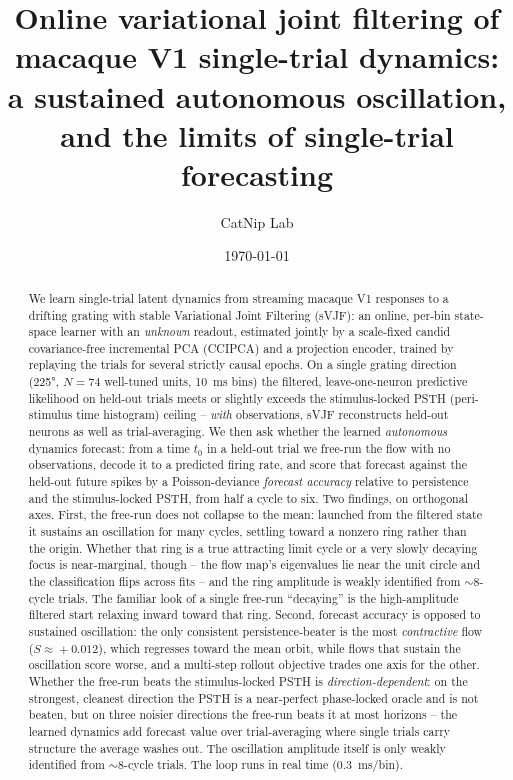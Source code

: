 \documentclass{article}
\title{Online variational joint filtering of macaque V1 single-trial dynamics:\\
a sustained autonomous oscillation, and the limits of single-trial forecasting}
\author{CatNip Lab}
\date{\today}
\newcommand{\svjf}{sVJF}
\begin{document}
\maketitle

\begin{abstract}
We learn single-trial latent dynamics from streaming macaque V1 responses to a drifting
grating with stable Variational Joint Filtering (\svjf{}): an online, per-bin state-space
learner with an \emph{unknown} readout, estimated jointly by a scale-fixed candid
covariance-free incremental PCA (CCIPCA) and a projection encoder, trained by replaying the
trials for several strictly causal epochs. On a single grating direction (\ang{225},
$N{=}74$ well-tuned units, \SI{10}{ms} bins) the filtered, leave-one-neuron predictive
likelihood on held-out trials meets or slightly exceeds the stimulus-locked PSTH
(peri-stimulus time histogram) ceiling -- \emph{with} observations, \svjf{} reconstructs
held-out neurons as well as trial-averaging. We then ask whether the learned \emph{autonomous}
dynamics forecast: from a time $t_0$ in a held-out trial we free-run the flow with no
observations, decode it to a predicted firing rate, and score that forecast against the
held-out future spikes by a Poisson-deviance \emph{forecast accuracy} relative to persistence
and the stimulus-locked PSTH, from half a cycle to six. Two findings, on orthogonal axes.
First, the free-run does not collapse to the mean: launched from the filtered state it sustains
an oscillation for many cycles, settling toward a nonzero ring rather than the origin. Whether
that ring is a true attracting limit cycle or a very slowly decaying focus is near-marginal,
though -- the flow map's eigenvalues lie near the unit circle and the classification flips across
fits -- and the ring amplitude is weakly identified from $\sim$8-cycle trials. The familiar look
of a single free-run ``decaying'' is the high-amplitude filtered start relaxing inward toward
that ring. Second, forecast accuracy is opposed to sustained oscillation: the only consistent
persistence-beater is the most \emph{contractive} flow ($S\!\approx\!{+}0.012$), which regresses
toward the mean orbit, while flows that sustain the oscillation score worse, and a multi-step
rollout objective trades one axis for the other. Whether the free-run beats the stimulus-locked
PSTH is \emph{direction-dependent}: on the strongest, cleanest direction the PSTH is a near-perfect
phase-locked oracle and is not beaten, but on three noisier directions the free-run beats it at
most horizons -- the learned dynamics add forecast value over trial-averaging where single trials
carry structure the average washes out. The oscillation amplitude itself is only weakly identified
from $\sim$8-cycle trials. The loop runs in real time (\SI{0.3}{ms}/bin).
\end{abstract}
\end{document}
